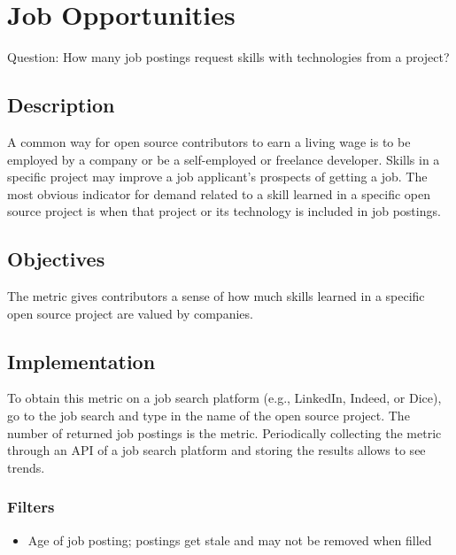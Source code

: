 \hypertarget{job-opportunities}{%
\section{Job Opportunities}\label{job-opportunities}}

Question: How many job postings request skills with technologies from a
project?

\hypertarget{description}{%
\subsection{Description}\label{description}}

A common way for open source contributors to earn a living wage is to be
employed by a company or be a self-employed or freelance developer.
Skills in a specific project may improve a job applicant's prospects of
getting a job. The most obvious indicator for demand related to a skill
learned in a specific open source project is when that project or its
technology is included in job postings.

\hypertarget{objectives}{%
\subsection{Objectives}\label{objectives}}

The metric gives contributors a sense of how much skills learned in a
specific open source project are valued by companies.

\hypertarget{implementation}{%
\subsection{Implementation}\label{implementation}}

To obtain this metric on a job search platform (e.g., LinkedIn, Indeed,
or Dice), go to the job search and type in the name of the open source
project. The number of returned job postings is the metric. Periodically
collecting the metric through an API of a job search platform and
storing the results allows to see trends.

\hypertarget{filters}{%
\subsubsection{Filters}\label{filters}}

\begin{itemize}
\tightlist
\item
  Age of job posting; postings get stale and may not be removed when
  filled
\end{itemize}

